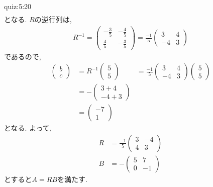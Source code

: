 \begin{answerof}{quiz:5:20}
\begin{align*}
 \end{align*}
 となる.  $R$の逆行列は,
 \begin{align*}
   R^{-1}=
 \begin{pmatrix}-\frac{3}{5}&-\frac{4}{5}\\\frac{4}{5}&-\frac{3}{5}\end{pmatrix}
=\frac{-1}{5} \begin{pmatrix}3&4\\-4&3\end{pmatrix}
 \end{align*}
 であるので,
\begin{align*}
  \begin{pmatrix}b\\c\end{pmatrix}
    &=R^{-1}\begin{pmatrix}5\\5\end{pmatrix}
    &=\frac{-1}{5} \begin{pmatrix}3&4\\-4&3\end{pmatrix}\begin{pmatrix}5\\5\end{pmatrix}\\
    &=-\begin{pmatrix}3+4\\-4+3\end{pmatrix}\\
    &=\begin{pmatrix}-7\\1\end{pmatrix}
 \end{align*}
となる.
よって,
\begin{align*}
  R&=\frac{-1}{5}\begin{pmatrix}3&-4\\4&3\end{pmatrix}\\
  B&=-\begin{pmatrix}5&7\\0&-1\end{pmatrix}
\end{align*}
 とすると$A=RB$を満たす.
\end{answerof}

